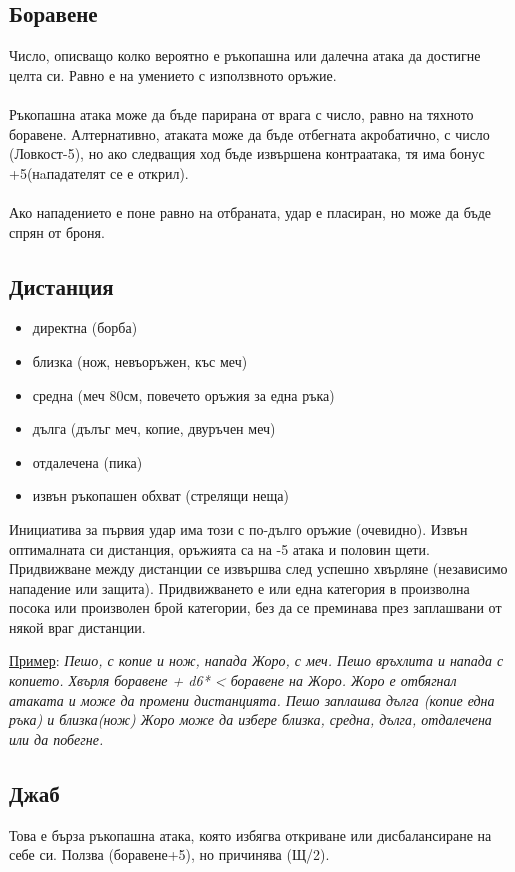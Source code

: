 \subsection{Боравене}
Число, описващо колко вероятно е ръкопашна или далечна атака да достигне целта си.
Равно е на умението с използвното оръжие.
\\
\\
Ръкопашна атака може да бъде парирана от врага с число, равно на тяхното боравене.
Алтернативно, атаката може да бъде отбегната акробатично, с число (Ловкост-5), но ако следващия ход бъде извършена контраатака, тя има бонус +5(нaпадателят се е открил).
\\
\\
Ако нападението е поне равно на отбраната, удар е пласиран, но може да бъде спрян от броня.


\subsection{Дистанция}
\begin{multicols}{2}
\begin{itemize}
\item{директна (борба)}
\item{близка (нож, невъоръжен, къс меч)}
\item{средна (меч 80см, повечето оръжия за една ръка)}
\item{дълга (дълъг меч, копие, двуръчен меч)}
\item{отдалечена (пика)}
\item{извън ръкопашен обхват (стрелящи неща)}
\end{itemize}
Инициатива за първия удар има този с по-дълго оръжие (очевидно).
Извън оптималната си дистанция, оръжията са на -5 атака и половин щети.
Придвижване между дистанции се извършва след успешно хвърляне (независимо нападение или защита).
Придвижването е или една категория в произволна посока или произволен брой категории, без да се преминава през заплашвани от някой враг дистанции.
\end{multicols}
\underline{Пример}:
\emph{Пешо, с копие и нож, напада Жоро, с меч.
Пешо връхлита и напада с копието.
Хвърля боравене + d6* < боравене на Жоро.
Жоро е отбягнал атаката и може да промени дистанцията.
Пешо заплашва дълга (копие една ръка) и близка(нож)
Жоро може да избере близка, средна, дълга, отдалечена или да побегне.
}


\subsection{Джаб}
Това е бърза ръкопашна атака, която избягва откриване или дисбалансиране на себе си.
Ползва (боравене+5), но причинява (Щ/2).


